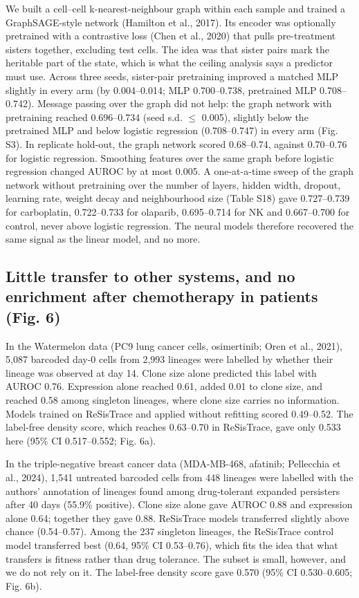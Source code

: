 \documentclass[11pt,a4paper]{article}
\begin{document}
We built a cell--cell k-nearest-neighbour graph within each sample and trained a GraphSAGE-style network (Hamilton et al., 2017). Its encoder was optionally pretrained with a contrastive loss (Chen et al., 2020) that pulls pre-treatment sisters together, excluding test cells. The idea was that sister pairs mark the heritable part of the state, which is what the ceiling analysis says a predictor must use. Across three seeds, sister-pair pretraining improved a matched MLP slightly in every arm (by 0.004--0.014; MLP 0.700--0.738, pretrained MLP 0.708--0.742). Message passing over the graph did not help: the graph network with pretraining reached 0.696--0.734 (seed s.d. $\leq$ 0.005), slightly below the pretrained MLP and below logistic regression (0.708--0.747) in every arm (Fig. S3). In replicate hold-out, the graph network scored 0.68--0.74, against 0.70--0.76 for logistic regression. Smoothing features over the same graph before logistic regression changed AUROC by at most 0.005. A one-at-a-time sweep of the graph network without pretraining over the number of layers, hidden width, dropout, learning rate, weight decay and neighbourhood size (Table S18) gave 0.727--0.739 for carboplatin, 0.722--0.733 for olaparib, 0.695--0.714 for NK and 0.667--0.700 for control, never above logistic regression. The neural models therefore recovered the same signal as the linear model, and no more.

\subsection*{Little transfer to other systems, and no enrichment after chemotherapy in patients (Fig. 6)}

In the Watermelon data (PC9 lung cancer cells, osimertinib; Oren et al., 2021), 5,087 barcoded day-0 cells from 2,993 lineages were labelled by whether their lineage was observed at day 14. Clone size alone predicted this label with AUROC 0.76. Expression alone reached 0.61, added 0.01 to clone size, and reached 0.58 among singleton lineages, where clone size carries no information. Models trained on ReSisTrace and applied without refitting scored 0.49--0.52. The label-free density score, which reaches 0.63--0.70 in ReSisTrace, gave only 0.533 here (95\% CI 0.517--0.552; Fig. 6a).

In the triple-negative breast cancer data (MDA-MB-468, afatinib; Pellecchia et al., 2024), 1,541 untreated barcoded cells from 448 lineages were labelled with the authors' annotation of lineages found among drug-tolerant expanded persisters after 40 days (55.9\% positive). Clone size alone gave AUROC 0.88 and expression alone 0.64; together they gave 0.88. ReSisTrace models transferred slightly above chance (0.54--0.57). Among the 237 singleton lineages, the ReSisTrace control model transferred best (0.64, 95\% CI 0.53--0.76), which fits the idea that what transfers is fitness rather than drug tolerance. The subset is small, however, and we do not rely on it. The label-free density score gave 0.570 (95\% CI 0.530--0.605; Fig. 6b).
\end{document}
